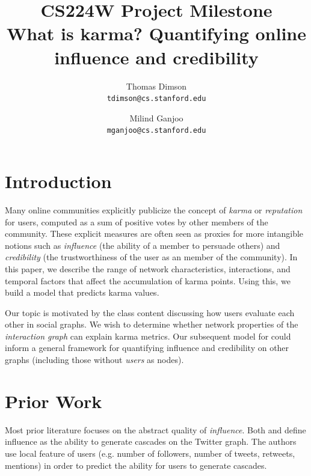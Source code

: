 \documentclass[10pt]{article}
\title{{\large CS224W Project Milestone} \\
  What is karma? Quantifying online influence and credibility
}
\author{Thomas Dimson \\ {\tt tdimson@cs.stanford.edu}
  \and
  Milind Ganjoo \\ {\tt mganjoo@cs.stanford.edu}
}
\date{}
\begin{document}
\maketitle


\section{Introduction}
Many online communities explicitly publicize the concept of \textit{karma} or
\textit{reputation} for users, computed as a sum of positive votes by other members of
the community. These explicit measures are often seen as proxies for more
intangible notions such as \textit{influence} (the ability of a member to
persuade others) and \textit{credibility} (the trustworthiness of the user as an
member of the community). In this paper, we describe the range of network
characteristics, interactions, and temporal factors that affect the accumulation
of karma points. Using this, we build a model that predicts karma values.

Our topic is motivated by the class content discussing how users evaluate
each other in social graphs. We wish to determine whether network properties of the 
\textit{interaction graph} can explain karma metrics. Our subsequent model for 
could inform a general framework for quantifying influence and credibility
on other graphs (including those without \textit{users} as nodes).

\section{Prior Work}
Most prior literature focuses on the abstract quality of \textit{influence}.
Both \citet{bakshy2011everyone} and \citet{cha2010measuring} define
influence as the ability to generate cascades on the Twitter graph. The authors
use local feature of users (e.g. number of followers, number of tweets,
retweets, mentions) in order to predict the ability for users to generate
cascades. 
\end{document}

